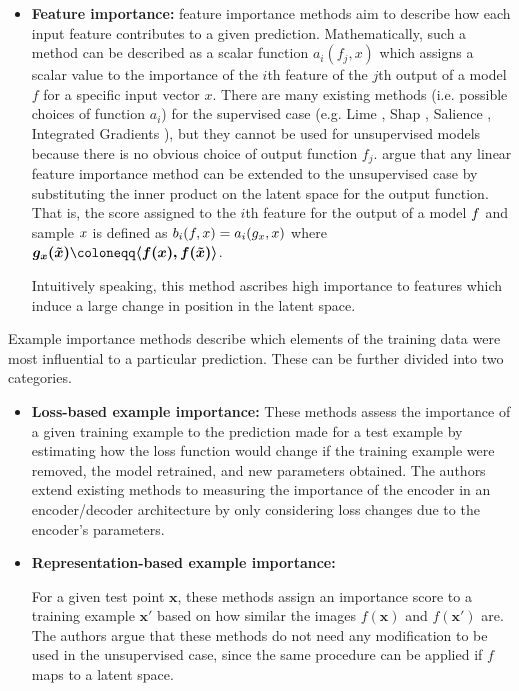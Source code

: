 \begin{itemize}
\item \textbf{Feature importance:} feature importance methods aim to describe how each input feature contributes to a given prediction. Mathematically, such a method can be described as a scalar function $a_i(f_j, x)$ which assigns a scalar value to the importance of the $i$th feature of the $j$th output of a model $f$ for a specific input vector $x$.   
There are many existing methods (i.e. possible choices of function $a_i$) for the supervised case (e.g. Lime \cite{ribeiro2016should}, Shap \cite{lundberg2017unified}, Salience \cite{simonyan2013deep}, Integrated Gradients \cite{sundararajan2017axiomatic}), but they cannot be used for unsupervised models because there is no obvious choice of output function $f_j$. \citet{crabbe2022label} argue that any linear feature importance method can be extended to the unsupervised case by substituting the inner product on the latent space for the output function. That is, the score assigned to the $i$th feature for the output of a model $\boldmath{f}$ and sample $\boldmath{x}$ is defined as $b_i(\boldmath{f},\boldmath{x})=a_i(\boldmath{g_x}, \boldmath{x})$ where $\boldmath{g_x(\tilde{x})} \coloneqq \langle \boldmath{f(x)}, \boldmath{f(\Tilde{x}}) \rangle$. 

Intuitively speaking, this method ascribes high importance to features which induce a large change in position in the latent space.

\end{itemize}
Example importance methods describe which elements of the training data were most influential to a particular prediction. These can be further divided into two categories.

\begin{itemize}

\item \textbf{Loss-based example importance:} These methods assess the importance of a given training example to the prediction made for a test example by estimating how the loss function would change if the training example were removed, the model retrained, and new parameters obtained. The authors extend existing methods to measuring the importance of the encoder in an encoder/decoder architecture by only considering loss changes due to the encoder’s parameters.

\newpage{}

\item \textbf{Representation-based example importance:}

For a given test point $\mathbf{x}$, these methods assign an importance score to a training example $\mathbf{x'}$ based on how similar the images $f(\mathbf{x})$ and $f(\mathbf{x'})$ are. The authors argue that these methods do not need any modification to be used in the unsupervised case, since the same procedure can be applied if $f$ maps to a latent space.

\end{itemize}

